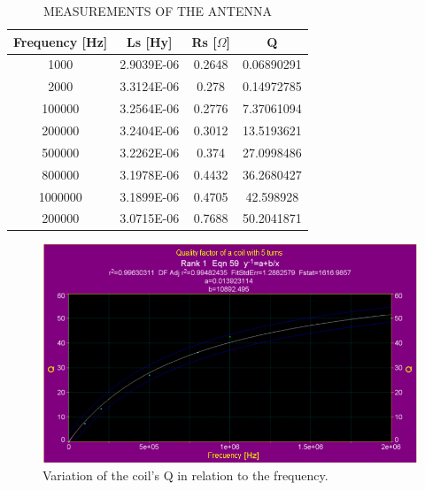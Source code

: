 \documentclass[a4paper, 10pt, conference]{ieeeconf}      %
\begin{document}
\begin{table}[H]
\centering
\caption{MEASUREMENTS OF THE ANTENNA}
\label{table:med_antena}
\begin{tabular}{c|c|c|c}
\textbf{Frequency  [Hz]} & \textbf{Ls [Hy]}       & \textbf{Rs [$\Omega$]} & \textbf{Q}                                                                                \\ \hline
1000                    & 2.9039E-06 & 0.2648   & 0.06890291                                                                             \\
2000                 & 3.3124E-06 & 0.278   & 0.14972785                                                                             \\
100000                  & 3.2564E-06 & 0.2776   & 7.37061094                                                                                 \\
200000                  & 3.2404E-06 & 0.3012   & 13.5193621                                                                             \\
500000                  & 3.2262E-06 & 0.374   & 27.0998486                                                                             \\
800000                  & 3.1978E-06 & 0.4432   & 36.2680427                                                                             \\
1000000                  & 3.1899E-06 & 0.4705   & 42.598928                                                                             \\
200000                  & 3.0715E-06 & 0.7688   & 50.2041871          
\end{tabular}
\end{table}

\begin{figure}[H]
\centering
\includegraphics[scale=0.4]{Images/ImagenesTesina/antena/Simulacion_Q_Antena_2.png}
\caption{Variation of the coil's Q in relation to the frequency.}
\label{fig:L_Qsim}
\end{figure}
\end{document}
